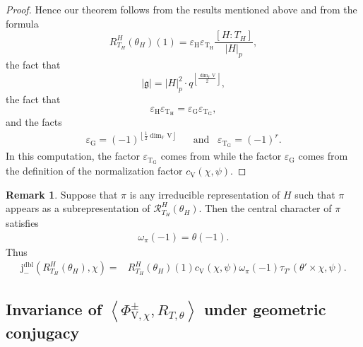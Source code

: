 \documentclass[12pt, reqno]{amsart}
\theoremstyle{definition}
\theoremstyle{definition}
\newtheorem{remark}[theorem]{Remark}
\theoremstyle{definition}
\newcommand{\sizeof}[1]{\left|#1\right|}
\newcommand{\hermitianSpace}{\mathrm{V}}
\newcommand{\innerproduct}[2]{\left\langle #1,#2\right\rangle}
\newcommand{\fieldCharacter}{\psi}
\newcommand{\centralCharacter}[1]{\omega_{#1}}
\newcommand{\grpIndex}[2]{\left[#1:#2\right]}
\newcommand{\finiteField}{\mathbb{F}}
\newcommand{\genHermitianJacobiKernel}[2]{\Phi^{\pm}_{#1,#2}}
\newcommand{\dblNegVirtualJacobiSumScalar}[2]{\mathrm{j}_{-}^{\mathrm{dbl}}\left(#1, #2\right)}
\newcommand{\GaussSumTorusCharacter}[4]{\tau_{#1}\left(#2 \times #3, #4\right)}
\newcommand{\lieAlgebra}{\mathfrak{g}}
\newcommand{\algebraicGroup}[1]{\boldsymbol{\mathrm{#1}}}
\newcommand{\RTTheta}[2]{R_{#1, #2}}
\newcommand{\RTGTheta}[3]{R_{#1}^{#2}(#3)}
\newcommand{\RTThetaVirtual}[3]{\mathcal{R}_{#1}^{#2}(#3)}
\begin{document}
\begin{proof}
	
	Hence our theorem follows from the results mentioned above and from the formula $$\RTGTheta{T_H}{H}{\theta_H}\left(1\right) = \varepsilon_{\algebraicGroup{H}} \varepsilon_{\algebraicGroup{T}_{\algebraicGroup{H}}} \frac{\grpIndex{H}{T_H}}{\sizeof{H}_p},$$ the fact that $$ \sizeof{\lieAlgebra} = \sizeof{H}_p^2 \cdot q^{\left\lfloor\frac{\dim_{\finiteField} \hermitianSpace}{2}\right\rfloor},$$
	the fact that \begin{equation*}
		\varepsilon_{\algebraicGroup{H}} \varepsilon_{\algebraicGroup{T}_{\algebraicGroup{H}}} = \varepsilon_{\algebraicGroup{G}} \varepsilon_{\algebraicGroup{T}_{\algebraicGroup{G}}},
	\end{equation*}
	and the facts
	\begin{align*}
		\varepsilon_{\algebraicGroup{G}} = \left(-1\right)^{\left\lfloor \frac{1}{2}\dim_{\finiteField} \hermitianSpace \right\rfloor} & \,\,\,\,\,\text{and}\,\,\,\,\, \varepsilon_{\algebraicGroup{T}_{\algebraicGroup{G}}} = \left(-1\right)^r.
	\end{align*}
	In this computation, the factor $\varepsilon_{\algebraicGroup{T}_{\algebraicGroup{G}}}$ comes from  while the factor $\varepsilon_{\algebraicGroup{G}}$ comes from the definition of the normalization factor $c_{\hermitianSpace}\left(\chi, \fieldCharacter\right)$.
\end{proof}
\begin{remark}
	Suppose that $\pi$ is any irreducible representation of $H$ such that $\pi$ appears as a subrepresentation of $\RTThetaVirtual{T_H}{H}{\theta_H}$. Then the central character of $\pi$ satisfies
	\begin{align*}
		\centralCharacter{\pi}\left(-1\right) = \theta\left(-1\right).
	\end{align*}
	Thus \begin{align*}
		\dblNegVirtualJacobiSumScalar{\RTGTheta{T_H}{H}{\theta_H}}{\chi} =& \RTGTheta{T_H}{H}{\theta_H}\left(1\right) c_{\hermitianSpace}\left(\chi, \fieldCharacter\right) \centralCharacter{\pi}\left(-1\right) \GaussSumTorusCharacter{T'}{\theta'}{\chi}{\fieldCharacter}.
	\end{align*}
\end{remark}

\subsection{Invariance of $\innerproduct{\genHermitianJacobiKernel{\hermitianSpace}{\chi}}{\RTTheta{T}{\theta}}$ under geometric conjugacy}
\end{document}
